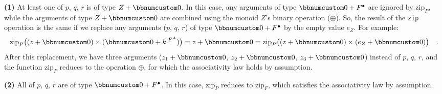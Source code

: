 \textbf{(1)} At least one of $p$, $q$, $r$ is of type $Z+\bbnum 0$.
In this case, any arguments of type $\bbnum 0+F^{\bullet}$ are ignored
by $\text{zip}_{P}$, while the arguments of type $Z+\bbnum 0$ are
combined using the monoid $Z$\textsf{'}s binary operation ($\oplus$). So,
the result of the \lstinline!zip! operation is the same if we replace
any arguments ($p$, $q$, $r$) of type $\bbnum 0+F^{\bullet}$ by
the empty value $e_{Z}$. For example:
\[
\text{zip}_{P}\big((z+\bbnum 0)\times(\bbnum 0+k^{:F^{A}})\big)=z+\bbnum 0=\text{zip}_{P}\big((z+\bbnum 0)\times(e_{Z}+\bbnum 0)\big)\quad.
\]
After this replacement, we have three arguments ($z_{1}+\bbnum 0$,
$z_{2}+\bbnum 0$, $z_{3}+\bbnum 0$) instead of $p$, $q$, $r$,
and the function $\text{zip}_{P}$ reduces to the operation $\oplus$,
for which the associativity law holds by assumption.

\textbf{(2)} All of $p$, $q$, $r$ are of type $\bbnum 0+F^{\bullet}$.
In this case, $\text{zip}_{P}$ reduces to $\text{zip}_{F}$, which
satisfies the associativity law by assumption.

